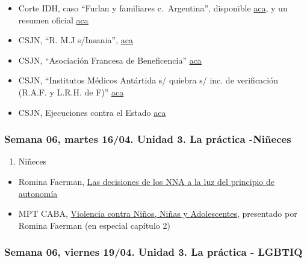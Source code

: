 \documentclass[
]{article}
\providecommand{\tightlist}{%
  \setlength{\itemsep}{0pt}\setlength{\parskip}{0pt}}
\begin{document}
\begin{itemize}
\item
  Corte IDH, caso ``Furlan y familiares c.~Argentina'', disponible
  \href{https://www.corteidh.or.cr/docs/casos/articulos/seriec_246_esp.pdf}{aca},
  y un resumen oficial
  \href{https://www.corteidh.or.cr/docs/casos/articulos/resumen_246_esp.pdf}{aca}
\item
  CSJN, ``R. M.J s/Insania'',
  \href{https://drive.google.com/file/d/1c29zw3cQDmwNGuO-GDR15KUq7Xc-UZJb/view?usp=sharing}{aca}
\item
  CSJN, ``Asociación Francesa de Beneficencia''
  \href{https://drive.google.com/file/d/1hVROXu_IFbswD_0UtcBpXPZ0gEbTIiQJ/view?usp=share_link}{aca}
\item
  CSJN, ``Institutos Médicos Antártida s/ quiebra s/ inc. de
  verificación (R.A.F. y L.R.H. de F)''
  \href{https://drive.google.com/file/d/1THtTAOVsLhI8y5mQq5mNTLrt-LFdFc-K/view?usp=sharing}{aca}
\item
  CSJN, Ejecuciones contra el Estado
  \href{https://drive.google.com/file/d/1X2oK8aGhqhadJ7YkQCHktaT49Ypk5udZ/view?usp=share_link}{aca}
\end{itemize}

\hypertarget{semana-06-martes-1604.-unidad-3.-la-pruxe1ctica--niuxf1eces}{%
\subsubsection{Semana 06, martes 16/04. Unidad 3. La práctica
-Niñeces}\label{semana-06-martes-1604.-unidad-3.-la-pruxe1ctica--niuxf1eces}}

\begin{enumerate}
\def\labelenumi{\alph{enumi}.}
\setcounter{enumi}{2}
\tightlist
\item
  Niñeces
\end{enumerate}

\begin{itemize}
\tightlist
\item
  Romina Faerman,
  \href{https://drive.google.com/file/d/1vjWDNx026ng38dl2I4G_ojXGlBQt23TT/view?usp=sharing}{Las
  decisiones de los NNA a la luz del principio de autonomía}
\item
  MPT CABA,
  \href{https://drive.google.com/file/d/1lc3H955K8Wx1-7mdtDAJX--CBBcqXfuX/view?usp=sharing}{Violencia
  contra Niños, Niñas y Adolescentes}, presentado por Romina Faerman (en
  especial capítulo 2)
\end{itemize}

\hypertarget{semana-06-viernes-1904.-unidad-3.-la-pruxe1ctica---lgbtiq}{%
\subsubsection{Semana 06, viernes 19/04. Unidad 3. La práctica -
LGBTIQ}\label{semana-06-viernes-1904.-unidad-3.-la-pruxe1ctica---lgbtiq}}
\end{document}
